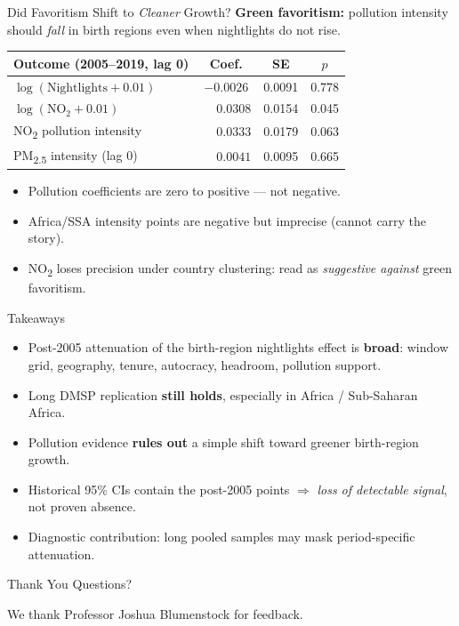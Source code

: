 \documentclass[10pt,aspectratio=169]{beamer}
\begin{document}
\begin{frame}{Did Favoritism Shift to \textit{Cleaner} Growth?}
\textbf{Green favoritism:} pollution intensity should \textit{fall} in birth regions even when nightlights do not rise.

\vspace{0.4em}
\centering
\small
\begin{tabular}{lccc}
\toprule
Outcome (2005--2019, lag 0) & Coef. & SE & $p$ \\
\midrule
$\log(\text{Nightlights}+0.01)$            & $-0.0026$ & 0.0091 & 0.778 \\
$\log(\text{NO}_2+0.01)$                   & $\phantom{-}0.0308$  & 0.0154 & 0.045 \\
NO\textsubscript{2} pollution intensity    & $\phantom{-}0.0333$  & 0.0179 & 0.063 \\
PM\textsubscript{2.5} intensity (lag 0)    & $\phantom{-}0.0041$  & 0.0095 & 0.665 \\
\bottomrule
\end{tabular}

\vspace{0.5em}
\begin{itemize}
  \item Pollution coefficients are \alert{zero to positive --- not negative}.
  \item Africa/SSA intensity points are negative but imprecise (cannot carry the story).
  \item NO\textsubscript{2} loses precision under country clustering: read as \textit{suggestive against} green favoritism.
\end{itemize}
\end{frame}

\begin{frame}{Takeaways}
\begin{itemize}
  \item Post-2005 attenuation of the birth-region nightlights effect is \textbf{broad}: window grid, geography, tenure, autocracy, headroom, pollution support.
  \item Long DMSP replication \textbf{still holds}, especially in Africa / Sub-Saharan Africa.
  \item Pollution evidence \textbf{rules out} a simple shift toward greener birth-region growth.
  \item Historical 95\% CIs contain the post-2005 points $\Rightarrow$ \textit{loss of detectable signal}, not proven absence.
  \item Diagnostic contribution: long pooled samples may mask period-specific attenuation.
\end{itemize}
\end{frame}

\begin{frame}{Thank You}
\centering
\Large Questions?

\vspace{0.6em}
\small We thank Professor Joshua Blumenstock for feedback.
\end{frame}
\end{document}
